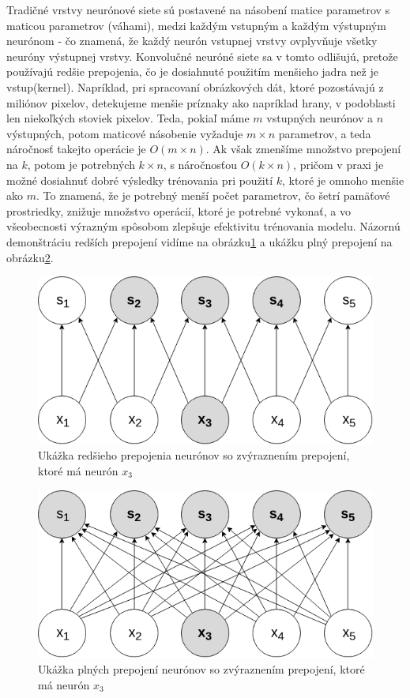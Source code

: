 \indent Tradičné vrstvy neurónové siete sú postavené na násobení matice parametrov s maticou parametrov (váhami), medzi každým vstupným a každým výstupným neurónom - čo znamená, že každý neurón vstupnej vrstvy ovplyvňuje všetky neuróny výstupnej vrstvy.
Konvolučné neuróné siete sa v tomto odlišujú, pretože používajú redšie prepojenia, čo je dosiahnuté použitím menšieho jadra než je vstup(kernel).
Napríklad, pri spracovaní obrázkových dát, ktoré pozostávajú z miliónov pixelov, detekujeme menšie príznaky ako napríklad hrany, v podoblasti len niekoľkých stoviek pixelov. \cite{goodfellow2016deep}
Teda, pokiaľ máme $m$ vstupných neurónov a $n$ výstupných, potom maticové násobenie vyžaduje $m \times n$ parametrov, a teda náročnosť takejto operácie je $O(m \times n)$.
Ak však zmenšíme množstvo prepojení na $k$, potom je potrebných $k \times n$, s náročnosťou $O(k \times n)$, pričom v praxi je možné dosiahnuť dobré výsledky trénovania pri použití $k$, ktoré je omnoho menšie ako $m$.
To znamená, že je potrebný menší počet parametrov, čo šetrí pamäťové prostriedky, znižuje množstvo operácií, ktoré je potrebné vykonať, a vo všeobecnosti výrazným spôsobom zlepšuje efektivitu trénovania modelu.
Názornú demonštráciu redších prepojení vidíme na obrázku\ref{fig:sparse} a ukážku plný prepojení na obrázku\ref{fig:fully}. 
 
\begin{figure}[H]
	\centering
	\includegraphics[width=0.5\linewidth]{img/sparse}
	\caption{Ukážka redšieho prepojenia neurónov so zvýraznením prepojení, ktoré má neurón $x_{3}$ }
	\label{fig:sparse}
\end{figure}

\begin{figure}[H]
	\centering
	\includegraphics[width=0.5\linewidth]{img/fully}
	\caption{Ukážka plných prepojení neurónov so zvýraznením prepojení, ktoré má neurón $x_{3}$} 
	\label{fig:fully}
\end{figure}

